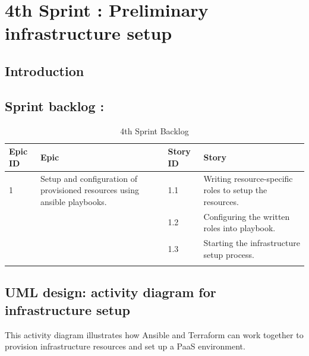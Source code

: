 \graphicspath{{./assets/}}
\setcounter{mtc}{6}
\chapter{4th Sprint : Preliminary infrastructure setup}

\minitoc
\newpage
\section*{Introduction}

\section{Sprint backlog :}

\begin{longtable}[H]{|m{1.5cm}|m{3cm}|m{1.5cm}|m{9cm}|}
\hline
{\textbf{Epic ID}} & {\textbf{Epic}} & {\textbf{Story ID}} & {\textbf{Story}}\\
\hline
1  & Setup and configuration of provisioned resources using ansible playbooks.	 &  1.1	 &  Writing resource-specific roles to setup the resources. \\
\cline{3-4}
& & 1.2 & Configuring the written roles into playbook. \\
\cline{3-4}
& & 1.3	& Starting the infrastructure setup process. \\
\cline{3-4}
\hline
\caption{4th Sprint Backlog}
\end{longtable}

\section{UML design: activity diagram for infrastructure setup}

This activity diagram illustrates how Ansible and Terraform can work together to provision infrastructure resources and set up a PaaS environment.

